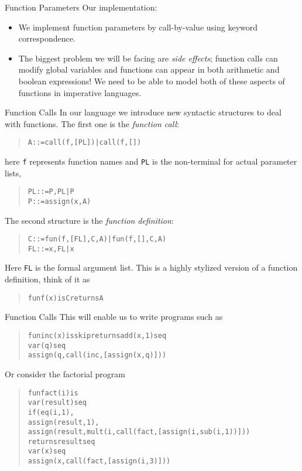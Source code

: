 \documentclass{beamer}
\begin{document}
\begin{frame}[fragile]{Function Parameters}
Our implementation:
\begin{itemize}
\item
We implement function parameters by call-by-value using keyword correspondence.
\item
The biggest problem we will be facing are {\em side effects}; function calls can modify 
global variables and functions can appear in both arithmetic and boolean expressions!
We need to be able to model both of these aspects of functions in imperative languages.
\end{itemize}
\end{frame}

\begin{frame}[fragile]{Function Calls}
\scriptsize
In our language we introduce  new syntactic structures to deal with  functions.
The first one is the {\em function call}:
\begin{quote}
\begin{alltt}
A ::= call(f,[ PL ])  |  call(f, [ ])
\end{alltt}
\end{quote}
here {\tt f} represents function names and {\tt PL} is the non-terminal for actual parameter lists,
\begin{quote}
\begin{alltt}
PL ::= P , PL  |  P
P  ::= assign(x,A) 
\end{alltt}
\end{quote}
The second structure is the {\em function definition}:
\begin{quote}
\begin{alltt}
C  ::= fun(f,[ FL ],C,A)  |  fun(f,[ ],C,A)
FL ::= x , FL  |  x
\end{alltt}
\end{quote}
Here {\tt FL} is the formal argument list. 
This is a highly stylized version of a function definition, think of it as
\begin{quote}
\begin{alltt}
fun f(x) is C returns A
\end{alltt}
\end{quote}
\end{frame}

\begin{frame}[fragile]{Function Calls}
\scriptsize
This will enable us to write programs such as
\begin{quote}
\begin{alltt}
fun inc(x) is skip returns add(x,1) seq
var(q) seq 
assign(q,call(inc,[assign(x,q)]))
\end{alltt}
\end{quote}
Or consider the factorial program
\begin{quote}
\begin{alltt}
fun fact(i) is 
        var(result) seq 
        if(eq(i,1), 
            assign(result,1),
            assign(result,mult(i,call(fact,[assign(i,sub(i,1))]))
    returns result seq
var(x) seq
assign(x,call(fact,[assign(i,3)]))
\end{alltt}
\end{quote}

\end{frame}
\end{document}
